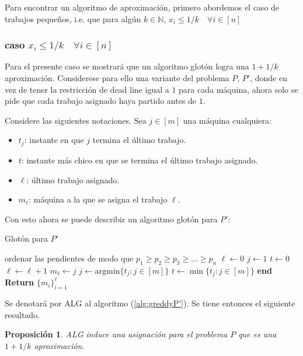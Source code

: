 \documentclass[10pt]{article}
\newcommand{\N}{\mathbb N}
\theoremstyle{plain}
\newtheorem{prop}{Proposición}
\theoremstyle{definition}
\begin{document}
Para encontrar un algoritmo de aproximaci\'on, primero abordemos el caso de trabajos peque\~nos, i.e. que para alg\'un $k\in \N$, $x_i \leq 1/k \quad \forall i \in [n]$
\subsubsection{caso $x_i \leq 1/k \quad \forall i \in [n]$}



Para el presente caso se mostrar\'a que un algoritmo glot\'on logra una $1+1/k$ aproximaci\'on. Considerese para ello una variante del problema $P$, $P'$, donde en vez de tener la restricción de dead line igual a $1$ para cada m\'aquina, ahora solo se pide que cada trabajo asignado haya partido antes de $1$.


Considere las siguientes notaciones. Sea $j \in [m]$ una m\'aquina cualquiera:
\begin{itemize}
\item $t_j$: instante en que $j$ termina el \'ultimo trabajo.
\item $t$: instante m\'as chico en que se termina el \'ultimo trabajo asignado.
\item $\ell$: \'ultimo trabajo asignado.
\item $m_\ell$: m\'aquina a la que se asigna el trabajo $\ell$.
\end{itemize}
Con esto ahora se puede describir un algoritmo glot\'on para $P'$:
\begin{algorithm}[H]
\caption{Glotón para $P'$}\label{alg:greddyP'}
\begin{algorithmic}[1]

\State ordenar las pendientes de modo que $p_1 \geq p_2 \geq p_3 \geq \ldots \geq p_n$  \;
\State $\ell \gets 0$\;
\State $j \gets 1$\;
\State $t \gets 0$\;
\State $\ell \gets \ell+1$\;
	\State $m_\ell \gets j$\;
	\State $j \gets \text{argmin}\{t_j: j \in [m]\}$\;
	\State $t \gets \min\{t_j: j \in [m]\}$\;
\EndWhile
\State \textbf{end}
\State \textbf{Return } $\{m_i\}_{i=1}^{\ell}$
\end{algorithmic}
\end{algorithm}
Se denotará por ALG al algoritmo (\ref{alg:greddyP'}). Se tiene entonces el siguiente resultado.
\begin{prop}
ALG induce una asignación para el problema $P$ que es una $1+1/k$ aproximación.
\end{prop}
\end{document}
